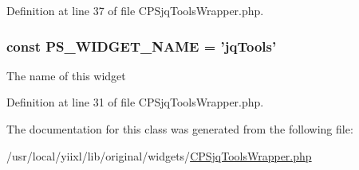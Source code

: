 Definition at line 37 of file CPSjqToolsWrapper.php.

\hypertarget{classCPSjqToolsWrapper_ae357f9dc377f7de0d12010b2ced28cbc}{
\subsubsection[{PS\_\-WIDGET\_\-NAME}]{\setlength{\rightskip}{0pt plus 5cm}const {\bf PS\_\-WIDGET\_\-NAME} = 'jqTools'}}
\label{classCPSjqToolsWrapper_ae357f9dc377f7de0d12010b2ced28cbc}
The name of this widget 

Definition at line 31 of file CPSjqToolsWrapper.php.



The documentation for this class was generated from the following file:\begin{DoxyCompactItemize}
\item 
/usr/local/yiixl/lib/original/widgets/\hyperlink{CPSjqToolsWrapper_8php}{CPSjqToolsWrapper.php}\end{DoxyCompactItemize}
